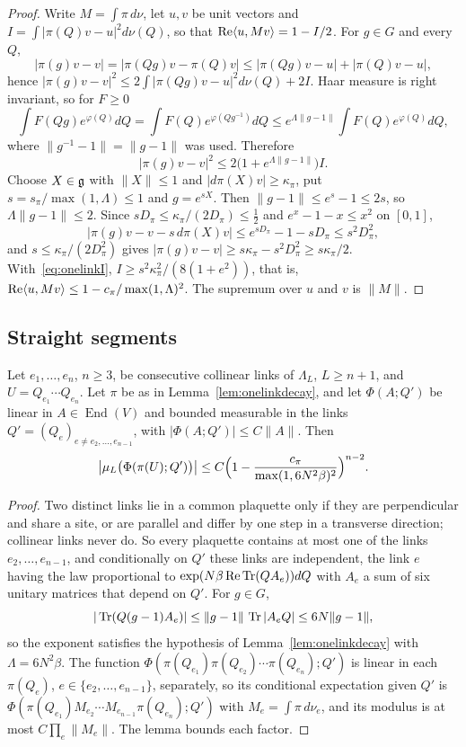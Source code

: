 \begin{proof}
Write $M=\int\pi\,d\nu$, let $u,v$ be unit vectors and
$I=\int|\pi(Q)v-u|^2d\nu(Q)$, so that $\operatorname{Re}\langle u,Mv\rangle=1-I/2$.
For $g\in G$ and every $Q$,
\[
|\pi(g)v-v|=|\pi(Qg)v-\pi(Q)v|\le|\pi(Qg)v-u|+|\pi(Q)v-u|,
\]
hence $|\pi(g)v-v|^2\le2\int|\pi(Qg)v-u|^2d\nu(Q)+2I$. Haar measure is right
invariant, so for $F\ge0$
\[
\int F(Qg)e^{\varphi(Q)}dQ=\int F(Q)e^{\varphi(Qg^{-1})}dQ
\le e^{\Lambda\|g-1\|}\int F(Q)e^{\varphi(Q)}dQ,
\]
where $\|g^{-1}-1\|=\|g-1\|$ was used. Therefore
\begin{equation}\label{eq:onelinkI}
|\pi(g)v-v|^2\le2\bigl(1+e^{\Lambda\|g-1\|}\bigr)I.
\end{equation}
Choose $X\in\mathfrak{g}$ with $\|X\|\le1$ and $|d\pi(X)v|\ge\kappa_\pi$, put
$s=s_\pi/\max(1,\Lambda)\le1$ and $g=e^{sX}$. Then $\|g-1\|\le e^s-1\le2s$, so
$\Lambda\|g-1\|\le2$. Since $sD_\pi\le\kappa_\pi/(2D_\pi)\le\frac12$ and
$e^x-1-x\le x^2$ on $[0,1]$,
\[
|\pi(g)v-v-s\,d\pi(X)v|\le e^{sD_\pi}-1-sD_\pi\le s^2D_\pi^2,
\]
and $s\le\kappa_\pi/(2D_\pi^2)$ gives $|\pi(g)v-v|\ge s\kappa_\pi-s^2D_\pi^2\ge
s\kappa_\pi/2$. With~\eqref{eq:onelinkI}, $I\ge s^2\kappa_\pi^2/(8(1+e^2))$,
that is, $\operatorname{Re}\langle u,Mv\rangle\le1-c_\pi/\max(1,\Lambda)^2$. The
supremum over $u$ and $v$ is $\|M\|$.
\end{proof}

\subsection{Straight segments}

\begin{proposition}\label{prop:segments}
Let $e_1,\dots,e_n$, $n\ge3$, be consecutive collinear links of $\Lambda_L$,
$L\ge n+1$, and $U=Q_{e_1}\cdots Q_{e_n}$. Let $\pi$ be as in
Lemma~\ref{lem:onelinkdecay}, and let $\Phi(A;Q')$ be linear in
$A\in\operatorname{End}(V)$ and bounded measurable in the links
$Q'=(Q_e)_{e\ne e_2,\dots,e_{n-1}}$, with $|\Phi(A;Q')|\le C\|A\|$. Then
\[
\bigl|\mu_L\bigl(\Phi(\pi(U);Q')\bigr)\bigr|\le
C\Bigl(1-\frac{c_\pi}{\max(1,6N^2\beta)^2}\Bigr)^{n-2}.
\]
\end{proposition}

\begin{proof}
Two distinct links lie in a common plaquette only if they are perpendicular
and share a site, or are parallel and differ by one step in a transverse
direction; collinear links never do. So every plaquette contains at most one
of the links $e_2,\dots,e_{n-1}$, and conditionally on $Q'$ these links are
independent, the link $e$ having the law proportional to
$\exp(N\beta\operatorname{Re}\operatorname{Tr}(QA_e))dQ$ with $A_e$ a sum of six unitary matrices that
depend on $Q'$. For $g\in G$,
\[
|\operatorname{Tr}(Q(g-1)A_e)|\le\|g-1\|\,\operatorname{Tr}|A_eQ|\le6N\|g-1\|,
\]
so the exponent satisfies the hypothesis of Lemma~\ref{lem:onelinkdecay} with
$\Lambda=6N^2\beta$. The function $\Phi(\pi(Q_{e_1})\pi(Q_{e_2})\cdots
\pi(Q_{e_n});Q')$ is linear in each $\pi(Q_e)$, $e\in\{e_2,\dots,e_{n-1}\}$,
separately, so its conditional expectation given $Q'$ is
$\Phi(\pi(Q_{e_1})M_{e_2}\cdots M_{e_{n-1}}\pi(Q_{e_n});Q')$ with
$M_e=\int\pi\,d\nu_e$, and its modulus is at most
$C\prod_e\|M_e\|$. The lemma bounds each factor.
\end{proof}

